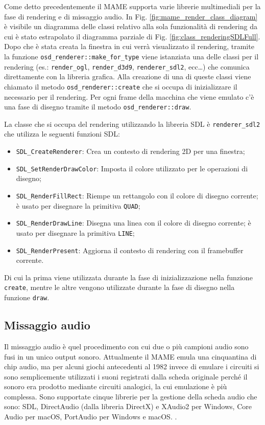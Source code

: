 Come detto precedentemente il MAME supporta varie librerie multimediali per la fase di rendering e di missaggio audio. In Fig. \ref{fig:mame_render_class_diagram} è visibile un diagramma delle classi relativo alla sola funzionalità di rendering da cui è stato estrapolato il diagramma parziale di Fig. \ref{fig:class_renderingSDLFull}. Dopo che è stata creata la finestra in cui verrà visualizzato il rendering, tramite la funzione \verb|osd_renderer::make_for_type| viene istanziata una delle classi per il rendering (es.: \verb|render_ogl|, \verb|render_d3d9|, \verb|renderer_sdl2|, ecc\dots) che comunica direttamente con la libreria grafica. Alla creazione di una di queste classi viene chiamato il metodo \verb|osd_renderer::create| che si occupa di inizializzare il necessario per il rendering. Per ogni frame della macchina che viene emulato c'è una fase di disegno tramite il metodo \verb|osd_renderer::draw|.

La classe che si occupa del rendering utilizzando la libreria SDL è \verb|renderer_sdl2| che utilizza le seguenti funzioni SDL:

\begin{itemize}	
	\item \verb|SDL_CreateRenderer|: Crea un contesto di rendering 2D per una finestra;
	\item \verb|SDL_SetRenderDrawColor|: Imposta il colore utilizzato per le operazioni di disegno;
	\item \verb|SDL_RenderFillRect|: Riempe un rettangolo con il colore di disegno corrente; è usato per disegnare la primitiva \verb|QUAD|;
	\item \verb|SDL_RenderDrawLine|: Disegna una linea con il colore di disegno corrente; è usato per disegnare la primitiva \verb|LINE|;
	\item \verb|SDL_RenderPresent|: Aggiorna il contesto di rendering con il framebuffer corrente.
\end{itemize}

Di cui la prima viene utilizzata durante la fase di inizializzazione nella funzione \verb|create|, mentre le altre vengono utilizzate durante la fase di disegno nella funzione \verb|draw|.

\subsection{Missaggio audio}
Il missaggio audio è quel procedimento con cui due o più campioni audio sono fusi in un unico output sonoro. Attualmente il MAME emula una cinquantina di chip audio, ma per alcuni giochi antecedenti al 1982 invece di emulare i circuiti si sono semplicemente utilizzati i suoni registrati dalla scheda originale perché il sonoro era prodotto mediante circuiti analogici, la cui emulazione è più complessa. Sono supportate cinque librerie per la gestione della scheda audio che sono: SDL, DirectAudio (dalla libreria DirectX) e XAudio2 per Windows, Core Audio per macOS, PortAudio per Windows e macOS. \parencite{Il_progetto_MAME}.

